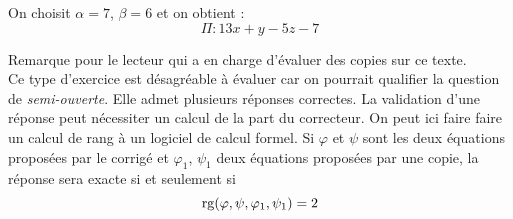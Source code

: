 On choisit $\alpha =7$, $\beta=6$ et on obtient :
\begin{displaymath}
 \Pi : 13x+y-5z-7
\end{displaymath}


Remarque pour le lecteur qui a en charge d'évaluer des copies sur ce texte.\\
Ce type d'exercice est désagréable à évaluer car on pourrait qualifier la question de \emph{semi-ouverte}. Elle admet plusieurs réponses correctes. La validation d'une réponse peut nécessiter un calcul de la part du correcteur. On peut ici faire faire un calcul de rang à un logiciel de calcul formel. Si $\varphi$ et $\psi$ sont les deux équations proposées par le corrigé et $\varphi_1$, $\psi_1$ deux équations proposées par une copie, la réponse sera exacte si et seulement si
\begin{displaymath}
 \operatorname{rg}(\varphi,\psi,\varphi_1,\psi_1)=2
\end{displaymath}

